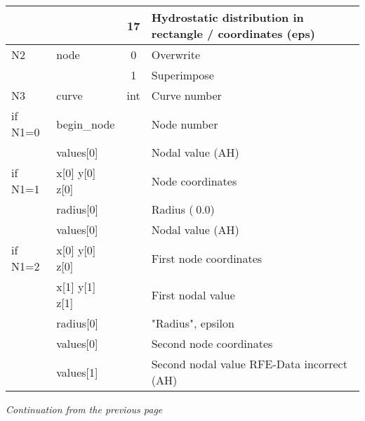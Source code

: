 \begin{tabular}{|l|p{2.75cm}|c|p{8.5cm}|}
            &                      &    17    & Hydrostatic distribution in rectangle / coordinates (eps)   \\
%
  \hline
%
  N2        & {\footnotesize node} &    0     & Overwrite    \\
            &                      &    1     & Superimpose  \\
%
  \hline
%
  N3        & {\footnotesize curve}&    int   & Curve number    \\
  \hline   \hline
  if N1=0   & {\footnotesize begin\_node}    &      & Node number                       \\
            & {\footnotesize values[0]}      &      & Nodal value        \hfill (AH)    \\
%
  \hline
%
  if N1=1   & {\footnotesize x[0] y[0] z[0]} &      & Node coordinates                  \\
            & {\footnotesize radius[0]}      &      & Radius ($\>$0.0)                     \\
            & {\footnotesize values[0]}      &      & Nodal value        \hfill (AH)    \\
%
  \hline
%
  if N1=2   & {\footnotesize x[0] y[0] z[0]} &      & First node coordinates            \\
            & {\footnotesize x[1] y[1] z[1]} &      & First nodal value                 \\
            & {\footnotesize radius[0]}      &      & "Radius", epsilon                 \\
            & {\footnotesize values[0]}      &      & Second node coordinates           \\
            & {\footnotesize values[1]}      &      & Second nodal value \hfill RFE-Data incorrect (AH)    \\
%
  \hline
%
\end{tabular}

\newpage
{\it Continuation from the previous page}


